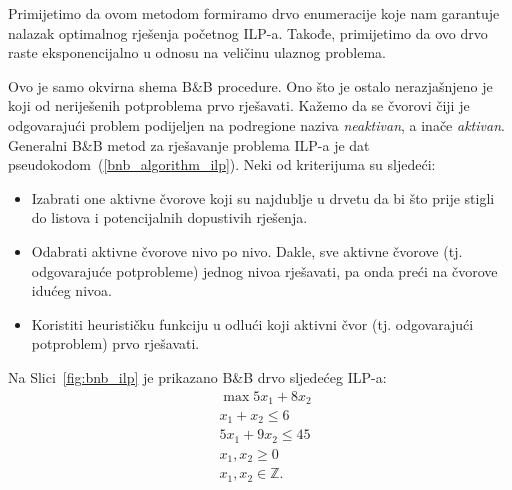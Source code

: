 \documentclass[a4paper, utf8, 11pt, colorlinks]{book}
\begin{document}
Primijetimo da ovom metodom formiramo drvo enumeracije koje nam garantuje nalazak optimalnog rješenja početnog ILP-a. Takođe, primijetimo da ovo drvo raste eksponencijalno u odnosu na veličinu ulaznog problema. 

  Ovo je samo okvirna shema B\&B procedure. Ono što je ostalo nerazjašnjeno je koji od neriješenih potproblema prvo rješavati. Kažemo da se čvorovi čiji je odgovarajući problem podijeljen na podregione naziva \emph{neaktivan}, a inače \emph{aktivan}. Generalni B\&B metod za rješavanje problema ILP-a je dat   pseudokodom~(\ref{bnb_algorithm_ilp}).  Neki od kriterijuma su sljedeći:
  \begin{itemize}
  	\item Izabrati one aktivne čvorove koji su najdublje u drvetu da bi što prije stigli do listova i potencijalnih dopustivih rješenja.
  	\item Odabrati aktivne čvorove nivo po nivo. Dakle, sve aktivne čvorove (tj. odgovarajuće potprobleme) jednog nivoa   rješavati, pa onda preći na čvorove idućeg nivoa. 
  	\item Koristiti heurističku funkciju u odlući koji aktivni čvor (tj. odgovarajući potproblem) prvo rješavati. 
  \end{itemize}

Na Slici~\ref{fig:bnb_ilp} je prikazano B\&B drvo sljedećeg ILP-a:
\begin{align*}
    &\max 5 x_1 + 8 x_2 \\
    &x_1 + x_2 \leq 6 \\
    & 5 x_1 + 9 x_2 \leq 45 \\
    & x_1, x_2 \geq 0\\
    & x_1,x_2 \in \mathbb{Z}.
\end{align*}

\end{document}
